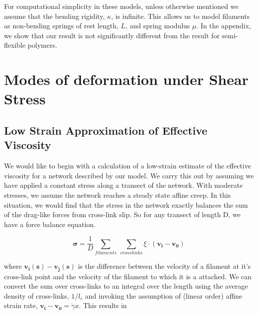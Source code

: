 \documentclass[pre,preprint]{revtex4-1}
\begin{document}
For computational simplicity in these models, unless otherwise mentioned we assume that the bending rigidity, $\kappa$, is infinite. This allows us to model filaments as non-bending springs of rest length, $L$, and spring modulus $\mu$.  In the appendix, we show that our result is not significantly different from the result for semi-flexible polymers.































\section{Modes of deformation under Shear Stress}


\subsection{Low Strain Approximation of Effective Viscosity}
We would like to begin with a calculation of a low-strain estimate of the effective viscosity for a network described by our model.  We carry this out by assuming we have applied a constant stress along a transect of the network.  With moderate stresses, we assume the network reaches a steady state affine creep. In this situation, we would find that the stress in the network exactly balances the sum of the drag-like forces from cross-link slip.  So for any transect of length D, we have a force balance equation.

\begin{equation}
\mathbf{\sigma} = \frac{1}{D}\sum_{filaments}\: \sum_{crosslinks}\xi \cdot (\mathbf{v_i}-\mathbf{v_0})
\end{equation}

where $\mathbf{v_i(s)}-\mathbf{v_j(s)}$ is the difference between the velocity of a filament at it's cross-link point and the velocity of the filament to which it is a attached. We can convert the sum over cross-links to an integral over the length using the average density of cross-links, $1/l_c$ and invoking the assumption of (linear order) affine strain rate, $\mathbf{v_i}-\mathbf{v_0}=\dot \gamma x$. This results in
\end{document}
